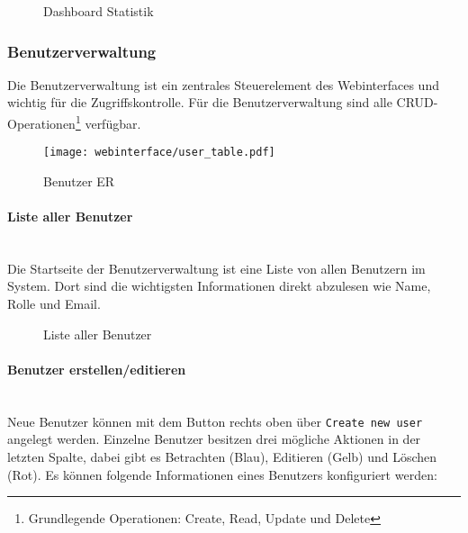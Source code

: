 \begin{figure}[H]
  \centering
  \caption{Dashboard Statistik}
\end{figure}


\subsubsection{Benutzerverwaltung}

Die Benutzerverwaltung ist ein zentrales Steuerelement des Webinterfaces und wichtig
für die Zugriffskontrolle. Für die Benutzerverwaltung sind alle CRUD-Operationen\footnote{Grundlegende Operationen:
Create, Read, Update und Delete} verfügbar.

\begin{figure}[H]
  \centering
  \texttt{[image: webinterface/user\_table.pdf]}
  \caption{Benutzer ER}
\end{figure}

\paragraph{Liste aller Benutzer}\mbox{}\\

Die Startseite der Benutzerverwaltung ist eine Liste von allen Benutzern im
System. Dort sind die wichtigsten Informationen direkt abzulesen wie Name, Rolle
und Email.

\begin{figure}[H]
  \centering
  \caption{Liste aller Benutzer}
\end{figure}

\paragraph{Benutzer erstellen/editieren}\mbox{}\\

Neue Benutzer können mit dem Button rechts oben über \verb|Create new user| angelegt
werden. Einzelne Benutzer besitzen drei mögliche Aktionen in der letzten Spalte,
dabei gibt es Betrachten (Blau), Editieren (Gelb) und Löschen (Rot). Es können
folgende Informationen eines Benutzers konfiguriert werden:

